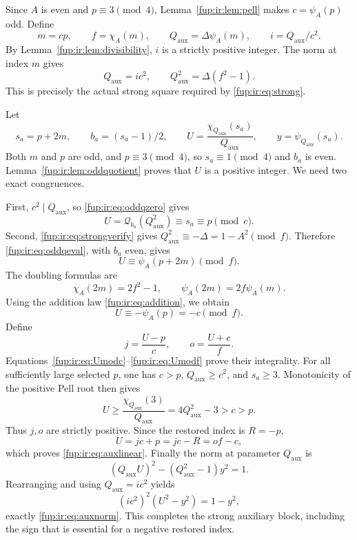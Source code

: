 \documentclass[11pt,letterpaper]{article}
\theoremstyle{definition}\newtheorem{definition}[theorem]{Definition}
\theoremstyle{remark}\newtheorem{remark}[theorem]{Remark}
\newcommand{\Qa}{Q_{\mathrm{aux}}}
\begin{document}
Since $A$ is even and $p\equiv3\pmod4$, Lemma~\ref{fup:ir:lem:pell} makes $c=\psi_A(p)$ odd. Define
\begin{equation}\label{fup:ir:eq:auxchoices}
 m=cp,\qquad f=\chi_A(m),\qquad
 \Qa=\Delta\psi_A(m),\qquad i=\Qa/c^2.
\end{equation}
By Lemma~\ref{fup:ir:lem:divisibility}, $i$ is a strictly positive integer. The norm at index $m$ gives
\begin{equation}\label{fup:ir:eq:strongverify}
 \Qa=ic^2,\qquad \Qa^2=\Delta(f^2-1).
\end{equation}
This is precisely the actual strong square required by \eqref{fup:ir:eq:strong}.

Let
\begin{equation}\label{fup:ir:eq:oddindex}
 s_a=p+2m,\qquad b_a=(s_a-1)/2,\qquad
 U=\frac{\chi_{\Qa}(s_a)}{\Qa},\qquad y=\psi_{\Qa}(s_a).
\end{equation}
Both $m$ and $p$ are odd, and $p\equiv3\pmod4$, so $s_a\equiv1\pmod4$ and $b_a$ is even. Lemma~\ref{fup:ir:lem:oddquotient} proves that $U$ is a positive integer. We need two exact congruences.

First, $c^2\mid\Qa$, so \eqref{fup:ir:eq:oddqzero} gives
\begin{equation}\label{fup:ir:eq:Umodc}
 U=\mathcal Q_{b_a}(\Qa^2)\equiv s_a\equiv p\pmod c.
\end{equation}
Second, \eqref{fup:ir:eq:strongverify} gives $\Qa^2\equiv-\Delta=1-A^2\pmod f$. Therefore \eqref{fup:ir:eq:oddqeval}, with $b_a$ even, gives
\[
 U\equiv\psi_A(p+2m)\pmod f.
\]
The doubling formulas are
\[
 \chi_A(2m)=2f^2-1,\qquad
 \psi_A(2m)=2f\psi_A(m).
\]
Using the addition law \eqref{fup:ir:eq:addition}, we obtain
\begin{equation}\label{fup:ir:eq:Umodf}
 U\equiv-\psi_A(p)=-c\pmod f.
\end{equation}
Define
\begin{equation}\label{fup:ir:eq:jo}
 j=\frac{U-p}{c},\qquad o=\frac{U+c}{f}.
\end{equation}
Equations~\eqref{fup:ir:eq:Umodc}--\eqref{fup:ir:eq:Umodf} prove their integrality. For all sufficiently large selected $p$, one has $c>p$, $\Qa\ge c^2$, and $s_a\ge3$. Monotonicity of the positive Pell root then gives
\[
 U\ge\frac{\chi_{\Qa}(3)}{\Qa}=4\Qa^2-3>c>p.
\]
Thus $j,o$ are strictly positive. Since the restored index is $R=-p$,
\[
 U=jc+p=jc-R=of-c,
\]
which proves \eqref{fup:ir:eq:auxlinear}. Finally the norm at parameter $\Qa$ is
\[
 (\Qa U)^2-(\Qa^2-1)y^2=1.
\]
Rearranging and using $\Qa=ic^2$ yields
\[
 (ic^2)^2(U^2-y^2)=1-y^2,
\]
exactly \eqref{fup:ir:eq:auxnorm}. This completes the strong auxiliary block, including the sign that is essential for a negative restored index.
\end{document}
